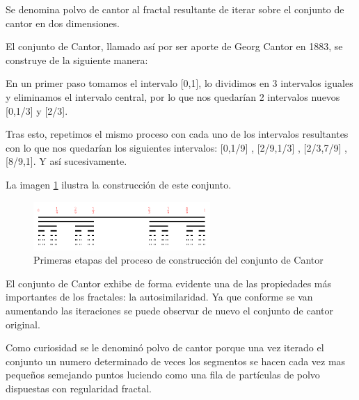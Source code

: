 \begin{definition}
Se denomina polvo de cantor al fractal resultante de iterar sobre el conjunto de cantor en dos dimensiones.
\end{definition}

\begin{definition}
El conjunto de Cantor, llamado así por ser aporte de Georg Cantor en 1883, se construye de la siguiente manera:

En un primer paso tomamos el intervalo [0,1], lo dividimos en 3 intervalos iguales y eliminamos el intervalo central, por lo que nos quedarían 2 intervalos nuevos [0,1/3] y [2/3].

Tras esto, repetimos el mismo proceso con cada uno de los intervalos resultantes con lo que nos quedarían los siguientes intervalos: [0,1/9] , [2/9,1/3] , [2/3,7/9] , [8/9,1]. Y así sucesivamente.

La imagen \ref{fig:conjuntoCantor} ilustra la construcción de este conjunto.
\end{definition}

\begin{figure}[hbtp]
\centering
\includegraphics[width = 0.6\textwidth]{img/conjuntoCantor.png}
\caption{Primeras etapas del proceso de construcción del conjunto de Cantor}
\label{fig:conjuntoCantor}
\end{figure}

El conjunto de Cantor exhibe de forma evidente una de las propiedades más importantes de los fractales: la autosimilaridad. Ya que conforme se van aumentando las iteraciones se puede observar de nuevo el conjunto de cantor original.

Como curiosidad se le denominó polvo de cantor porque una vez iterado el conjunto un numero determinado de veces los segmentos se hacen cada vez mas pequeños semejando puntos luciendo como una fila de partículas de polvo dispuestas con regularidad fractal.


